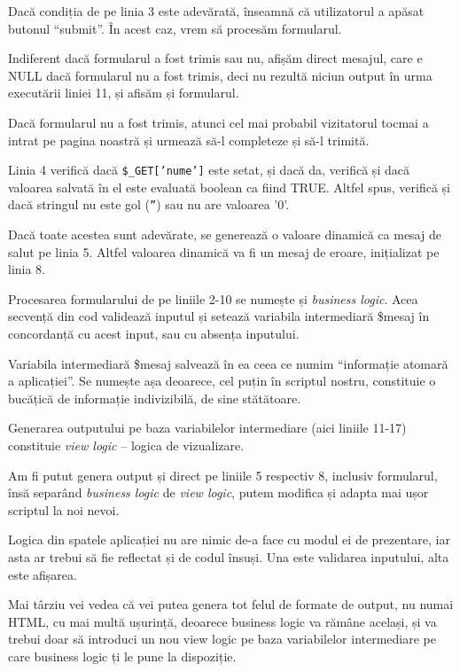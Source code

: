 Dacă condiția de pe linia 3 este adevărată, înseamnă că utilizatorul a apăsat
butonul ``submit''. În acest caz, vrem să procesăm formularul.

Indiferent
dacă formularul a fost trimis sau nu, 
afișăm direct mesajul, care e NULL dacă formularul nu a fost trimis, deci nu rezultă niciun output în
urma executării liniei 11, și afisăm și formularul.

Dacă formularul nu a fost trimis, atunci cel mai probabil vizitatorul tocmai a intrat
pe pagina noastră și urmează să-l completeze și să-l trimită.

Linia 4 verifică dacă \texttt{\$\_GET['nume']} este setat, și dacă da, verifică
și dacă valoarea salvată în el este evaluată boolean ca fiind TRUE. Altfel spus,
verifică și dacă stringul nu este gol (\texttt{''}) sau nu are valoarea '0'.

Dacă toate acestea sunt adevărate, se generează o valoare dinamică ca mesaj de salut pe linia 5.
Altfel valoarea dinamică va fi un mesaj de eroare, inițializat pe linia 8.

Procesarea formularului de pe liniile 2-10 se numește și \textsl{business logic}.
Acea secvență
din cod validează inputul și setează variabila intermediară \$mesaj în concordanță
cu acest input, sau cu absența inputului.

Variabila intermediară \$mesaj salvează în ea ceea ce numim ``informație atomară a aplicației''.
Se numește așa deoarece, cel puțin în scriptul nostru, constituie o bucățică de informație
indivizibilă, de sine stătătoare.

Generarea outputului pe baza variabilelor intermediare (aici liniile 11-17) constituie
\textsl{view logic} -- logica de vizualizare.

Am fi putut genera output și direct pe liniile 5 respectiv 8, inclusiv formularul,
însă separând \textsl{business logic} de \textsl{view logic},
putem modifica și adapta mai ușor scriptul la noi nevoi.

Logica din spatele aplicației nu are nimic de-a face cu modul ei de prezentare, iar
asta ar trebui să fie reflectat și de codul însuși. Una este validarea inputului,
alta este afișarea.

Mai târziu vei vedea că vei putea genera tot felul de formate de output, nu numai HTML,
cu mai multă ușurință, deoarece business logic va rămâne același, și va trebui
doar să introduci un nou view logic pe baza variabilelor intermediare pe care business logic
ți le pune la dispoziție.

